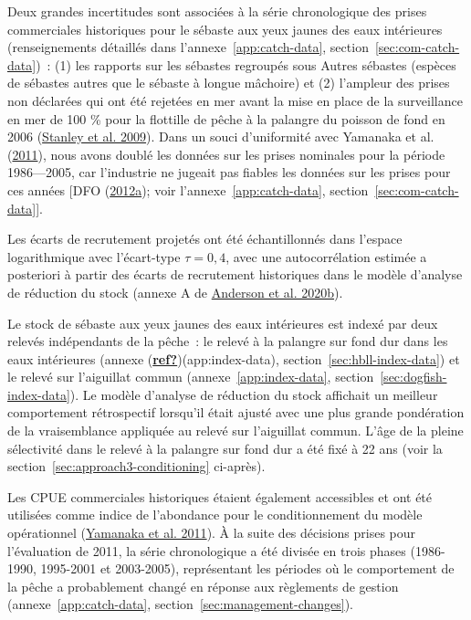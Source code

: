 \documentclass[french,11pt]{book}
\begin{document}
Deux grandes incertitudes sont associées à la série chronologique des prises commerciales historiques pour le sébaste aux yeux jaunes des eaux intérieures (renseignements détaillés dans l'annexe~\ref{app:catch-data}, section~\ref{sec:com-catch-data})~: (1) les rapports sur les sébastes regroupés sous Autres sébastes (espèces de sébastes autres que le sébaste à longue mâchoire) et (2) l'ampleur des prises non déclarées qui ont été rejetées en mer avant la mise en place de la surveillance en mer de 100 \% pour la flottille de pêche à la palangre du poisson de fond en 2006 (\protect\hyperlink{ref-stanley2009}{Stanley et al. 2009}). Dans un souci d'uniformité avec Yamanaka et al. (\protect\hyperlink{ref-yamanaka2011}{2011}), nous avons doublé les données sur les prises nominales pour la période 1986---2005, car l'industrie ne jugeait pas fiables les données sur les prises pour ces années {[}DFO (\protect\hyperlink{ref-dfo2012}{2012a}); voir l'annexe~\ref{app:catch-data}, section~\ref{sec:com-catch-data}{]}.

Les écarts de recrutement projetés ont été échantillonnés dans l'espace logarithmique avec l'écart-type \(\tau = 0,4\), avec une autocorrélation estimée a posteriori à partir des écarts de recrutement historiques dans le modèle d'analyse de réduction du stock (annexe A de \protect\hyperlink{ref-anderson2020gfmp}{Anderson et al. 2020b}).

Le stock de sébaste aux yeux jaunes des eaux intérieures est indexé par deux relevés indépendants de la pêche~: le relevé à la palangre sur fond dur dans les eaux intérieures (annexe (\protect\hyperlink{ref-ref}{\textbf{ref?}})(app:index-data), section~\ref{sec:hbll-index-data}) et le relevé sur l'aiguillat commun (annexe~\ref{app:index-data}, section~\ref{sec:dogfish-index-data}). Le modèle d'analyse de réduction du stock affichait un meilleur comportement rétrospectif lorsqu'il était ajusté avec une plus grande pondération de la vraisemblance appliquée au relevé sur l'aiguillat commun. L'âge de la pleine sélectivité dans le relevé à la palangre sur fond dur a été fixé à 22 ans (voir la section~\ref{sec:approach3-conditioning} ci-après).

Les CPUE commerciales historiques étaient également accessibles et ont été utilisées comme indice de l'abondance pour le conditionnement du modèle opérationnel (\protect\hyperlink{ref-yamanaka2011}{Yamanaka et al. 2011}). À la suite des décisions prises pour l'évaluation de 2011, la série chronologique a été divisée en trois phases (1986-1990, 1995-2001 et 2003-2005), représentant les périodes où le comportement de la pêche a probablement changé en réponse aux règlements de gestion (annexe~\ref{app:catch-data}, section~\ref{sec:management-changes}).
\end{document}
